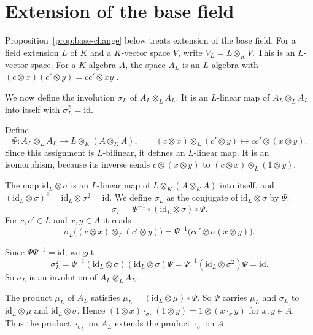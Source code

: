 \documentclass[]{interact}
\theoremstyle{plain}
\theoremstyle{definition}
\theoremstyle{remark}
\begin{document}
\section{Extension of the base field}\label{sec:base-change}

Proposition~\ref{prop:base-change} below treats extension of the base field.
For a field extension $L$ of $K$ and a $K$-vector space $V$, write $V_L = L \otimes_K V$.
This is an $L$-vector space. %
For a $K$-algebra $A$, the space $A_L$ is an $L$-algebra with $(c \otimes x)(c' \otimes y) = cc' \otimes xy$ \citep[Chapter 2, \S5, p.~74]{Lam2001}.

We now define the involution $\sigma_L$ of $A_L \otimes_L A_L$.
It is an $L$-linear map of $A_L \otimes_L A_L$ into itself with $\sigma_L^2 = \mathrm{id}$.

Define
\[
\Psi \colon A_L \otimes_L A_L \to L \otimes_K (A \otimes_K A), \qquad
(c \otimes x) \otimes_L (c' \otimes y) \longmapsto cc' \otimes (x \otimes y).
\]
Since this assignment is $L$-bilinear, it defines an $L$-linear map.
It is an isomorphism, because its inverse sends $c \otimes (x \otimes y)$ to $(c \otimes x) \otimes_L (1 \otimes y)$.

The map $\mathrm{id}_L \otimes \sigma$ is an $L$-linear map of $L \otimes_K (A \otimes_K A)$ into itself, and $(\mathrm{id}_L \otimes \sigma)^2 = \mathrm{id}_L \otimes \sigma^2 = \mathrm{id}$.
We define $\sigma_L$ as the conjugate of $\mathrm{id}_L \otimes \sigma$ by $\Psi$:
\[
\sigma_L = \Psi^{-1} \circ (\mathrm{id}_L \otimes \sigma) \circ \Psi.
\]
For $c, c' \in L$ and $x, y \in A$ it reads
\[
\sigma_L\bigl((c \otimes x) \otimes_L (c' \otimes y)\bigr) = \Psi^{-1}\bigl(cc' \otimes \sigma(x \otimes y)\bigr).
\]

Since $\Psi \Psi^{-1} = \mathrm{id}$, we get
\[
\sigma_L^2 = \Psi^{-1} (\mathrm{id}_L \otimes \sigma)(\mathrm{id}_L \otimes \sigma) \Psi = \Psi^{-1} (\mathrm{id}_L \otimes \sigma^2) \Psi = \mathrm{id}.
\]
So $\sigma_L$ is an involution of $A_L \otimes_L A_L$.

The product $\mu_L$ of $A_L$ satisfies $\mu_L = (\mathrm{id}_L \otimes \mu) \circ \Psi$.
So $\Psi$ carries $\mu_L$ and $\sigma_L$ to $\mathrm{id}_L \otimes \mu$ and $\mathrm{id}_L \otimes \sigma$.
Hence $(1 \otimes x) \cdot_{\sigma_L} (1 \otimes y) = 1 \otimes (x \cdot_\sigma y)$ for $x, y \in A$.
Thus the product $\cdot_{\sigma_L}$ on $A_L$ extends the product $\cdot_\sigma$ on $A$.
\end{document}
